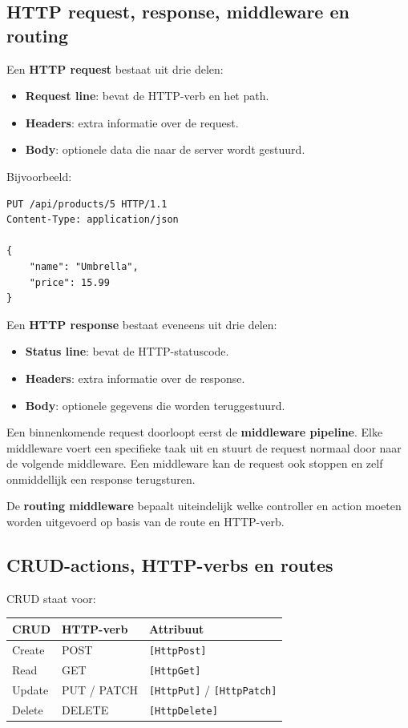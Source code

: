 \subsection{HTTP request, response, middleware en routing}

Een \textbf{HTTP request} bestaat uit drie delen:
\begin{itemize}
    \item \textbf{Request line}: bevat de HTTP-verb en het path.
    \item \textbf{Headers}: extra informatie over de request.
    \item \textbf{Body}: optionele data die naar de server wordt gestuurd.
\end{itemize}

Bijvoorbeeld:

\begin{verbatim}
PUT /api/products/5 HTTP/1.1
Content-Type: application/json

{
    "name": "Umbrella",
    "price": 15.99
}
\end{verbatim}

Een \textbf{HTTP response} bestaat eveneens uit drie delen:
\begin{itemize}
    \item \textbf{Status line}: bevat de HTTP-statuscode.
    \item \textbf{Headers}: extra informatie over de response.
    \item \textbf{Body}: optionele gegevens die worden teruggestuurd.
\end{itemize}

Een binnenkomende request doorloopt eerst de \textbf{middleware pipeline}.
Elke middleware voert een specifieke taak uit en stuurt de request normaal door
naar de volgende middleware. Een middleware kan de request ook stoppen en
zelf onmiddellijk een response terugsturen.

De \textbf{routing middleware} bepaalt uiteindelijk welke controller en action
moeten worden uitgevoerd op basis van de route en HTTP-verb.

\subsection{CRUD-actions, HTTP-verbs en routes}

CRUD staat voor:

\begin{center}
\begin{tabular}{lll}
\textbf{CRUD} & \textbf{HTTP-verb} & \textbf{Attribuut} \\
\hline
Create & POST & \texttt{[HttpPost]} \\
Read & GET & \texttt{[HttpGet]} \\
Update & PUT / PATCH & \texttt{[HttpPut]} / \texttt{[HttpPatch]} \\
Delete & DELETE & \texttt{[HttpDelete]} \\
\end{tabular}
\end{center}

